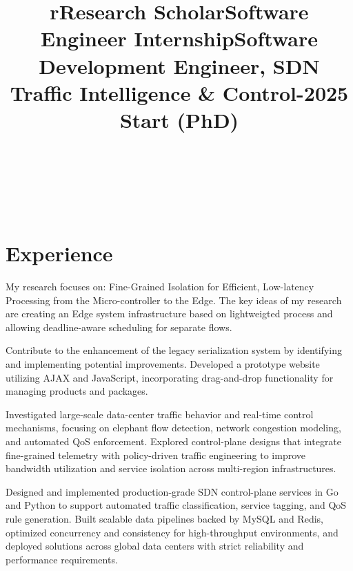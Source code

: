 \begin{format}
\title{r}\\
\\
\body\\
\end{format}
\section{Experience}
\title{Research Scholar}
\begin{position}
	\phantom{XXx}My research focuses on: Fine-Grained Isolation for Efficient, Low-latency Processing from the Micro-controller to the Edge. The key ideas of my research are creating an Edge system infrastructure based on lightweigted process and allowing deadline-aware scheduling for separate flows.
\end{position}

\title{Software Engineer Internship}
\begin{position}
	\phantom{XXx}Contribute to the enhancement of the legacy serialization system by identifying and implementing potential improvements. Developed a prototype website utilizing AJAX and JavaScript, incorporating drag-and-drop functionality for managing products and packages.
\end{position}

\title{\small Software Development Engineer, SDN Traffic Intelligence \& Control-2025 Start (PhD)}
\begin{position}
	\phantom{XXx} Investigated large-scale data-center traffic behavior and real-time control mechanisms, focusing on elephant flow detection, network congestion modeling, and automated QoS enforcement. Explored control-plane designs that integrate fine-grained telemetry with policy-driven traffic engineering to improve bandwidth utilization and service isolation across multi-region infrastructures.

	\phantom{XXx} Designed and implemented production-grade SDN control-plane services in Go and Python to support automated traffic classification, service tagging, and QoS rule generation. Built scalable data pipelines backed by MySQL and Redis, optimized concurrency and consistency for high-throughput environments, and deployed solutions across global data centers with strict reliability and performance requirements.
\end{position}

